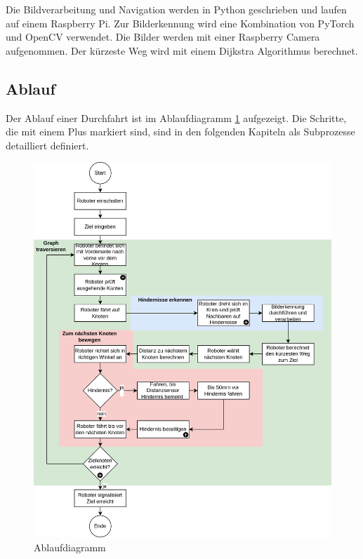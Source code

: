 Die Bildverarbeitung und Navigation werden in Python geschrieben und laufen auf einem Raspberry Pi. Zur Bilderkennung wird eine Kombination von PyTorch und OpenCV verwendet. Die Bilder werden mit einer Raspberry Camera aufgenommen. Der kürzeste Weg wird mit einem Dijkstra Algorithmus berechnet.


\subsection{Ablauf}

Der Ablauf einer Durchfahrt ist im Ablaufdiagramm \ref{fig:ablaufdiagramm} aufgezeigt.
Die Schritte, die mit einem Plus markiert sind, sind in den folgenden Kapiteln als Subprozesse detailliert definiert.

\begin{figure}[H]
\centering
\includegraphics[width=\textwidth]{assets/gesamtkonzept/ablaufdiagramm.png}
\caption{Ablaufdiagramm}
\label{fig:ablaufdiagramm}
\end{figure}



